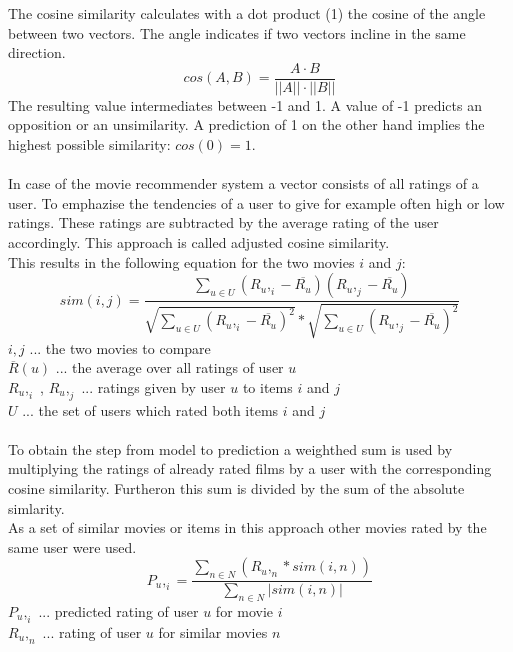 \documentclass[a4paper,12pt,twoside]{article}
\begin{document}
The cosine similarity calculates with a dot product (1) the cosine of the angle between two vectors.
The angle indicates if two vectors incline in the same direction.
\begin{equation}
cos(A, B) = \frac { A \cdot  B}{|| A|| \cdot || B||}
\end{equation}
The resulting value intermediates between -1 and 1. A value of -1 predicts an opposition or an unsimilarity. A prediction of 1 on the other hand implies the highest possible similarity: $cos(0) = 1$. \\
\\
In case of the movie recommender system a vector consists of all ratings of a user. To emphazise the tendencies of a user to give for example often high or low ratings. These ratings are subtracted by the average rating of the user accordingly. This approach is called adjusted cosine similarity.\\  
This results in the following equation for the two movies $i$ and $j$:\\
\begin{equation}
sim (i,j) = 
\frac{
	\displaystyle\sum_{u \in U} (R_u,_i - \overline{R_u})(R_u,_j - \overline{R_u})
}
{
	\sqrt{ \displaystyle\sum_{u \in U} (R_u,_i - \overline{R_u})^2} 
	* \sqrt{\displaystyle\sum_{u \in U} (R_u,_j - \overline{R_u})^2}
}
\end{equation}
$ i,j$ ... the two movies to compare \\
$\overline{R}(u)$ ... the average over all ratings of user $u$ \\
$R_u,_i$ , $R_u,_j$  ... ratings given by user $u$ to items $i$ and $j$\\
$U$ ... the set of users which rated both items $i$ and $j$\\
\\
To obtain the step from model to prediction a weighthed sum is used by multiplying the ratings of already rated films by a user with the corresponding cosine similarity. Furtheron this sum is divided by the sum of the absolute simlarity. \\ 
As a set of similar movies or items in this approach other movies rated by the same user were used.\cite{sarwar} 
\begin{equation}
P_u,_i = \frac{
\displaystyle\sum_{n \in N}(R_u,_n*sim(i,n))
}{
\displaystyle\sum_{n \in N}|sim(i,n)|
}
\end{equation}
$P_u,_i$ ... predicted rating of user $u$ for movie $i$\\
$R_u,_n$ ... rating of user $u$ for similar movies $n$\\
\end{document}
